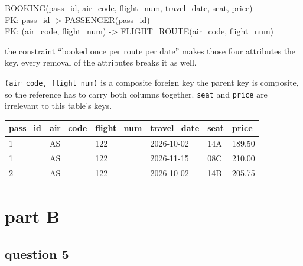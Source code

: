 \documentclass[12pt]{article}
\newcommand{\schema}[1]{%
  \begin{center}%
  \setlength{\fboxsep}{8pt}%
  \colorbox{gray!10}{%
    \begin{minipage}{0.93\linewidth}\ttfamily\small\raggedright #1\end{minipage}}%
  \end{center}%
}
\begin{document}
\schema{
BOOKING(\underline{pass\_id}, \underline{air\_code}, \underline{flight\_num},
\underline{travel\_date}, seat, price)\\[4pt]
FK: pass\_id -> PASSENGER(pass\_id)\\
FK: (air\_code, flight\_num) -> FLIGHT\_ROUTE(air\_code, flight\_num)
}

the constraint ``booked once per route per date'' 
makes those four attributes the key. every removal of the attributes breaks it as well.

\texttt{(air\_code, flight\_num)} is a composite foreign key the parent key
is composite, so the reference has to carry both columns together.
\texttt{seat} and \texttt{price} are irrelevant to this table's keys.

\begin{table}[H]
\centering
\begin{tabular}{|l|l|l|l|l|l|}
\hline
\textbf{pass\_id} & \textbf{air\_code} & \textbf{flight\_num} & \textbf{travel\_date} & \textbf{seat} & \textbf{price} \\
\hline
1 & AS & 122 & 2026-10-02 & 14A & 189.50 \\
1 & AS & 122 & 2026-11-15 & 08C & 210.00 \\
2 & AS & 122 & 2026-10-02 & 14B & 205.75 \\
\hline
\end{tabular}
\end{table}

\section*{part B}

\subsection*{question 5}
\end{document}
